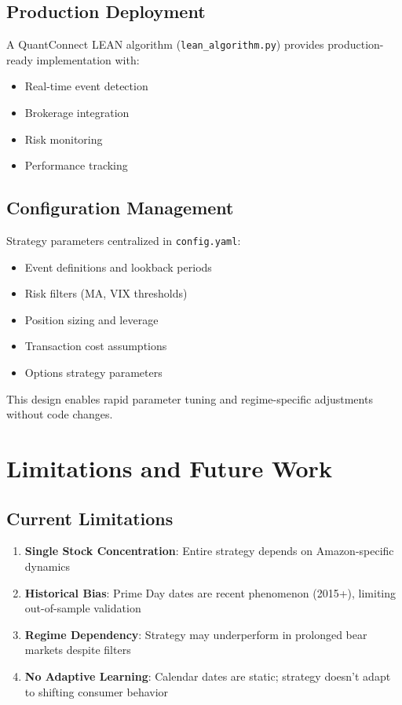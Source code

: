 \documentclass[twocolumn,ieee]{arithmaxresearch}
\begin{document}
\subsection{Production Deployment}

A QuantConnect LEAN algorithm (\texttt{lean\_algorithm.py}) provides production-ready implementation with:
\begin{itemize}
    \item Real-time event detection
    \item Brokerage integration
    \item Risk monitoring
    \item Performance tracking
\end{itemize}

\subsection{Configuration Management}

Strategy parameters centralized in \texttt{config.yaml}:
\begin{itemize}
    \item Event definitions and lookback periods
    \item Risk filters (MA, VIX thresholds)
    \item Position sizing and leverage
    \item Transaction cost assumptions
    \item Options strategy parameters
\end{itemize}

This design enables rapid parameter tuning and regime-specific adjustments without code changes.

\section{Limitations and Future Work}

\subsection{Current Limitations}

\begin{enumerate}
    \item \textbf{Single Stock Concentration}: Entire strategy depends on Amazon-specific dynamics
    \item \textbf{Historical Bias}: Prime Day dates are recent phenomenon (2015+), limiting out-of-sample validation
    \item \textbf{Regime Dependency}: Strategy may underperform in prolonged bear markets despite filters
    \item \textbf{No Adaptive Learning}: Calendar dates are static; strategy doesn't adapt to shifting consumer behavior
\end{enumerate}
\end{document}
